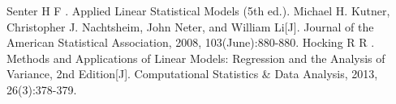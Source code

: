 \documentclass[UTF8]{ctexart}
\begin{document}
\begin{thebibliography}{99}
    Senter H F . Applied Linear Statistical Models (5th ed.). Michael H. Kutner, Christopher J. Nachtsheim, John Neter, and William Li[J]. Journal of the American Statistical Association, 2008, 103(June):880-880.  
    Hocking R R . Methods and Applications of Linear Models: Regression and the Analysis of Variance, 2nd Edition[J]. Computational Statistics \& Data Analysis, 2013, 26(3):378-379.
\end{thebibliography}
\end{document}
